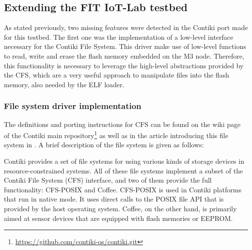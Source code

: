 \subsection{Extending the FIT IoT-Lab testbed}
As stated previously, two missing features were detected in the Contiki port made for this testbed.
The first one was the implementation of a low-level interface necessary for the Contiki File System.
This driver make use of low-level functions to read, write and erase the flash memory embedded on the M3 node.
Therefore, this functionality is necessary to leverage the high-level abstractions provided by the CFS, which are a very useful approach to manipulate files into the flash memory, also needed by the ELF loader.


\subsubsection{File system driver implementation}
The definitions and porting instructions for CFS can be found on the wiki page of the Contiki main repository\footnote{\url{https://github.com/contiki-os/contiki.git}} as well as in the article introducing this file system in  \cite{tsiftes09enabling}.
A brief description of the file system is given as follows:

\begin{citeverbatim}
	Contiki provides a set of file systems for using various kinds of storage devices in resource-constrained systems. 
	All of these file systems implement a subset of the Contiki File System (CFS) interface, and two of them provide the full functionality: CFS-POSIX and Coffee.
	CFS-POSIX is used in Contiki platforms that run in native mode. 
	It uses direct calls to the POSIX file API that is provided by the host operating system. 
	Coffee, on the other hand, is primarily aimed at sensor devices that are equipped with flash memories or EEPROM.
\end{citeverbatim}

